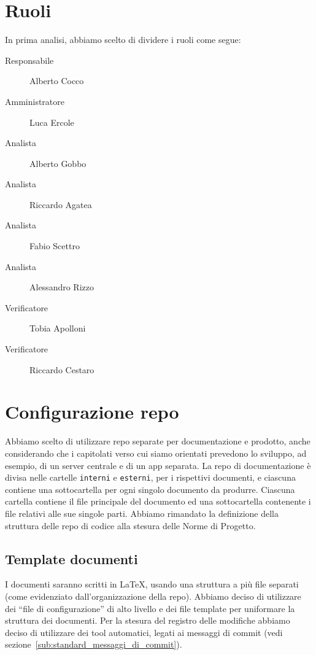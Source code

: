 \documentclass{article}
\begin{document}
\section{Ruoli}%
\label{sec:ruoli}

In prima analisi, abbiamo scelto di dividere i ruoli come segue:

\begin{description}
  \item[Responsabile] Alberto Cocco
  \item[Amministratore] Luca Ercole
  \item[Analista] Alberto Gobbo
  \item[Analista] Riccardo Agatea
  \item[Analista] Fabio Scettro
  \item[Analista] Alessandro Rizzo
  \item[Verificatore] Tobia Apolloni
  \item[Verificatore] Riccardo Cestaro
\end{description}

\section{Configurazione repo}%
\label{sec:configurazione_repo}

Abbiamo scelto di utilizzare repo separate per documentazione e prodotto, anche considerando che i capitolati verso cui siamo orientati prevedono lo sviluppo, ad esempio, di un server centrale e di un app separata.
La repo di documentazione è divisa nelle cartelle \verb|interni| e \verb|esterni|, per i rispettivi documenti, e ciascuna contiene una sottocartella per ogni singolo documento da produrre.
Ciascuna cartella contiene il file principale del documento ed una sottocartella contenente i file relativi alle sue singole parti.
Abbiamo rimandato la definizione della struttura delle repo di codice alla stesura delle Norme di Progetto.

\subsection{Template documenti}%
\label{sub:template_documenti}

I documenti saranno scritti in LaTeX, usando una struttura a più file separati (come evidenziato dall'organizzazione della repo).
Abbiamo deciso di utilizzare dei ``file di configurazione'' di alto livello e dei file template per uniformare la struttura dei documenti.
Per la stesura del registro delle modifiche abbiamo deciso di utilizzare dei tool automatici, legati ai messaggi di commit (vedi sezione~\ref{sub:standard_messaggi_di_commit}).
\end{document}
